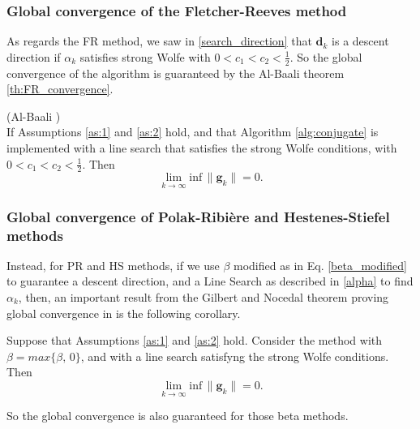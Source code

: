 \subsubsection{Global convergence of the Fletcher-Reeves method}
As regards the FR method, we saw in \ref{search_direction} that $\mathbf{d}_k$ is a descent direction if $\alpha_k$ satisfies strong Wolfe with $0 < c_1 < c_2 < \frac{1}{2}$. So the global convergence of the algorithm is guaranteed by the Al-Baali theorem \ref{th:FR_convergence}.
\begin{theorem}(Al-Baali \cite{baali})\\
\label{th:FR_convergence}
If Assumptions \ref{as:1} and \ref{as:2} hold, and that Algorithm \ref{alg:conjugate} is implemented with a line search that satisfies the strong Wolfe conditions, with $0 < c_1 < c_2 < \frac{1}{2}$. Then
\begin{equation}
      \lim_{k\to\infty} \mathrm{inf} \, \|\mathbf{g}_k\| = 0.
\end{equation}
\end{theorem}

\subsubsection{Global convergence of Polak-Ribière and Hestenes-Stiefel methods }
Instead, for PR and HS methods, if we use $\beta$ modified as in Eq. \ref{beta_modified} to guarantee a descent direction, and a Line Search as described in \ref{alpha} to find $\alpha_k$, then, an important result from the Gilbert and Nocedal theorem proving global convergence in \cite{nocedal_global_convergence} is the following corollary.
\begin{corollary}
Suppose that Assumptions \ref{as:1} and \ref{as:2} hold. Consider the method with $\beta = max\{\beta, \, 0\}$, and with a line search satisfyng the strong Wolfe conditions. Then
\begin{equation}
      \lim_{k\to\infty} \mathrm{inf} \, \|\mathbf{g}_k\| = 0.
\end{equation}
\end{corollary}
\noindent So the global convergence is also guaranteed for those beta methods.

